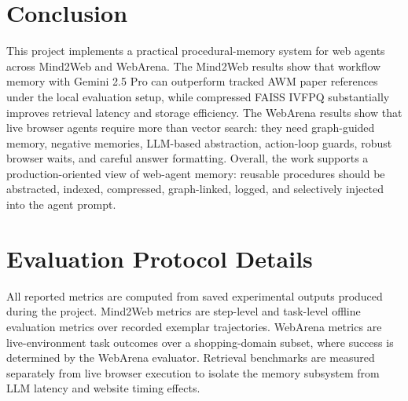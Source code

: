 \documentclass[11pt]{article}
\begin{document}
\section{Conclusion}

This project implements a practical procedural-memory system for web agents across Mind2Web and WebArena. The Mind2Web results show that workflow memory with Gemini 2.5 Pro can outperform tracked AWM paper references under the local evaluation setup, while compressed FAISS IVFPQ substantially improves retrieval latency and storage efficiency. The WebArena results show that live browser agents require more than vector search: they need graph-guided memory, negative memories, LLM-based abstraction, action-loop guards, robust browser waits, and careful answer formatting. Overall, the work supports a production-oriented view of web-agent memory: reusable procedures should be abstracted, indexed, compressed, graph-linked, logged, and selectively injected into the agent prompt.

\appendix

\section{Evaluation Protocol Details}

All reported metrics are computed from saved experimental outputs produced during the project. Mind2Web metrics are step-level and task-level offline evaluation metrics over recorded exemplar trajectories. WebArena metrics are live-environment task outcomes over a shopping-domain subset, where success is determined by the WebArena evaluator. Retrieval benchmarks are measured separately from live browser execution to isolate the memory subsystem from LLM latency and website timing effects.
\end{document}
